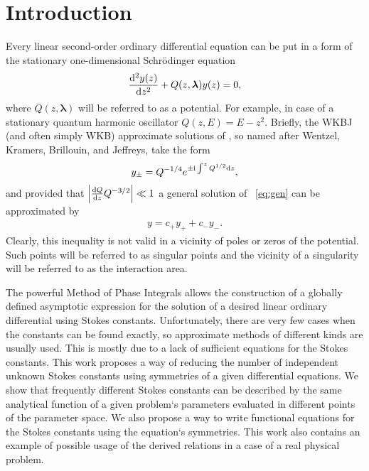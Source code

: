 \documentclass[12pt]{iopart}
\def\lmbd{\bm{\lambda}}
\begin{document}
\section{Introduction \label{sec:intro}}
Every linear second-order ordinary differential equation can be put in a form of the stationary one-dimensional Schr\"odinger equation
\begin{eqnarray}
\frac{\rmd^2 y(z)}{\rmd z^2} + Q(z,\lmbd)y(z) = 0,   \label{eq:gen}
\end{eqnarray}
where \mbox{$Q(z,\lmbd)$} will be referred to as a potential. For example, in case of a stationary quantum harmonic oscillator \mbox{$Q(z,E)=E-z^2$}. Briefly, the WKBJ (and often simply WKB) 
approximate solutions of , so named after
Wentzel, Kramers, Brillouin, and Jeffreys\cite{wkbj}, take the form
\begin{eqnarray}
y_\pm = Q^{-1/4} e^{\pm \mathrm{i} \int^z Q^{1/2} \mathrm{d} z},   \label{eq:wkb}
\end{eqnarray}
and provided that
$\left|\frac{\mathrm{d} Q}{\mathrm{d} z}Q^{-3/2}\right| \ll 1 $
a general solution of ~\ref{eq:gen} can be approximated by
\begin{eqnarray}
y = c_+y_+ + c_-y_-.    \label{eq:gensol}
\end{eqnarray}
Clearly, this inequality is not valid in a vicinity of poles or zeros of the potential. Such points will be referred to as singular points and the vicinity of a singularity will be referred to as the interaction area.


The powerful Method of Phase Integrals allows the construction of a globally defined asymptotic expression for the solution of a desired linear ordinary differential using Stokes constants. Unfortunately, there are very few cases when the constants can be found exactly, so approximate methods of different kinds \cite{white,ours} are usually used. This is mostly due to a lack of sufficient equations for the Stokes constants. This work proposes a way of reducing the number of independent unknown Stokes constants using symmetries of a given differential equations. We show that frequently different Stokes constants can be described by the same analytical function of a given problem`s parameters evaluated in different points of the parameter space.  We also propose a way to write functional equations for the Stokes constants using the equation`s symmetries. This work also contains an example of possible usage of the derived relations in a case of a real physical problem. 
\end{document}
